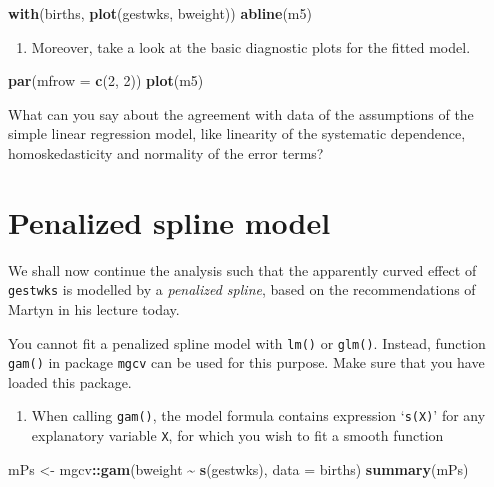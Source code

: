 \documentclass[
]{book}
\newenvironment{Shaded}{\begin{snugshade}}{\end{snugshade}}
\newcommand{\AttributeTok}[1]{\textcolor[rgb]{0.13,0.29,0.53}{#1}}
\newcommand{\DecValTok}[1]{\textcolor[rgb]{0.00,0.00,0.81}{#1}}
\newcommand{\FunctionTok}[1]{\textcolor[rgb]{0.13,0.29,0.53}{\textbf{#1}}}
\newcommand{\NormalTok}[1]{#1}
\newcommand{\OtherTok}[1]{\textcolor[rgb]{0.56,0.35,0.01}{#1}}
\newcommand{\SpecialCharTok}[1]{\textcolor[rgb]{0.81,0.36,0.00}{\textbf{#1}}}
\providecommand{\tightlist}{%
  \setlength{\itemsep}{0pt}\setlength{\parskip}{0pt}}
\begin{document}
\begin{Shaded}
\begin{Highlighting}[]
\FunctionTok{with}\NormalTok{(births, }\FunctionTok{plot}\NormalTok{(gestwks, bweight))}
\FunctionTok{abline}\NormalTok{(m5)}
\end{Highlighting}
\end{Shaded}

\begin{enumerate}
\def\labelenumi{\arabic{enumi}.}
\setcounter{enumi}{2}
\tightlist
\item
  Moreover, take a look at the basic diagnostic plots for the fitted model.
\end{enumerate}

\begin{Shaded}
\begin{Highlighting}[]
\FunctionTok{par}\NormalTok{(}\AttributeTok{mfrow =} \FunctionTok{c}\NormalTok{(}\DecValTok{2}\NormalTok{, }\DecValTok{2}\NormalTok{))}
\FunctionTok{plot}\NormalTok{(m5)}
\end{Highlighting}
\end{Shaded}

What can you say about the agreement with data of the assumptions of the
simple linear regression model,
like linearity of the systematic dependence,
homoskedasticity and normality of the error terms?

\section{Penalized spline model}\label{penalized-spline-model}

We shall now continue the analysis such that the apparently curved effect
of \texttt{gestwks} is modelled by a \emph{penalized spline},
based on the recommendations of Martyn in his lecture today.

You cannot fit a penalized spline model with \texttt{lm()} or
\texttt{glm()}. Instead, function \texttt{gam()} in package
\texttt{mgcv} can be used for this purpose. Make sure that you have loaded
this package.

\begin{enumerate}
\def\labelenumi{\arabic{enumi}.}
\tightlist
\item
  When calling \texttt{gam()}, the model formula contains
  expression `\texttt{s(X)}' for any explanatory variable \texttt{X},
  for which you wish to fit a smooth function
\end{enumerate}

\begin{Shaded}
\begin{Highlighting}[]
\NormalTok{mPs }\OtherTok{\textless{}{-}}\NormalTok{ mgcv}\SpecialCharTok{::}\FunctionTok{gam}\NormalTok{(bweight }\SpecialCharTok{\textasciitilde{}} \FunctionTok{s}\NormalTok{(gestwks), }\AttributeTok{data =}\NormalTok{ births)}
\FunctionTok{summary}\NormalTok{(mPs)}
\end{Highlighting}
\end{Shaded}
\end{document}
